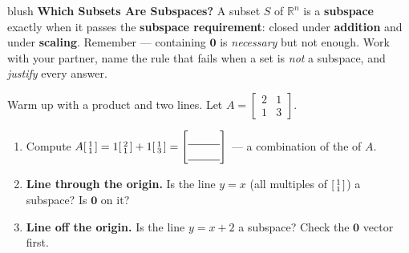 \documentclass[10pt]{article}
\newcommand{\zero}{\mathbf{0}}
\begin{document}
\namepartnerperiod

\vspace{0.10in}

\begin{headlinebox}{blush}
\small\textbf{Which Subsets Are Subspaces?} A subset $S$ of $\mathbb{R}^n$ is a \textbf{subspace}
exactly when it passes the \textbf{subspace requirement}: closed under \textbf{addition} and under
\textbf{scaling}. Remember --- containing $\zero$ is \emph{necessary} but not enough. Work with your
partner, name the rule that fails when a set is \emph{not} a subspace, and \emph{justify} every answer.
\end{headlinebox}

\vspace{0.10in}

\begin{tcolorbox}[colback=white, colframe=black!40, title=\textbf{Tier R --- Remediate},
    fonttitle=\bfseries, arc=1.5mm, left=3mm, right=3mm, top=2mm, bottom=2mm, breakable]
Warm up with a product and two lines. Let $A=\begin{bmatrix} 2 & 1 \\ 1 & 3 \end{bmatrix}$.
\begin{enumerate}[leftmargin=1.7em, itemsep=8pt]
  \item Compute $A\begin{bsmallmatrix} 1\\1 \end{bsmallmatrix}=1\begin{bsmallmatrix} 2\\1 \end{bsmallmatrix}+1\begin{bsmallmatrix} 1\\3 \end{bsmallmatrix}
        =\begin{bmatrix}\rule{0pt}{1.0em}\blank{1.0cm}\\[2pt]\blank{1.0cm}\end{bmatrix}$
        \; --- a combination of the \blank{2.2cm} of $A$.
  \item \textbf{Line through the origin.} Is the line $y=x$ (all multiples of $\begin{bsmallmatrix} 1\\1 \end{bsmallmatrix}$)
        a subspace? Is $\zero$ on it? \; \blank{3.2cm}
  \item \textbf{Line off the origin.} Is the line $y=x+2$ a subspace? Check the $\zero$ vector first.
        \; \blank{3.6cm}
\end{enumerate}
\end{tcolorbox}
\end{document}
